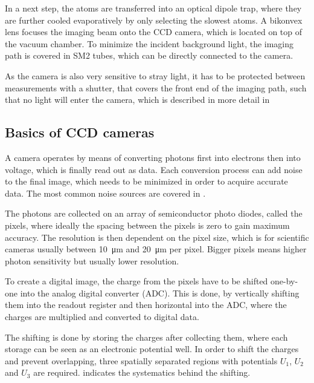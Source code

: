 	In a next step, the atoms are transferred into an optical dipole trap, where they are further cooled evaporatively by only selecting the slowest atoms.
	A bikonvex lens focuses the imaging beam onto the CCD camera, which is located on top of the vacuum chamber. To minimize the incident background light, the imaging path is covered in SM2 tubes, which can be directly connected to the camera.
	
	As the camera is also very sensitive to stray light, it has to be protected between measurements with a shutter, that covers the front end of the imaging path, such that no light will enter the camera, which is described in more detail in 

\subsection{Basics of CCD cameras}
\label{ch:ccd_basics}
	
	A camera operates by means of converting photons first into electrons then into voltage, which is finally read out as data\cite{ccdoperationUrl}\cite{guppy38Bsheet}. Each conversion process can add noise to the final image, which needs to be minimized in order to acquire accurate data. The most common noise sources are covered in .
	
	The photons are collected on an array of semiconductor photo diodes, called the pixels, where ideally the spacing between the pixels is zero to gain maximum accuracy. The resolution is then dependent on the pixel size, which is for scientific cameras usually between \SI{10}{\micro\meter} and \SI{20}{\micro\meter} per pixel. Bigger pixels means higher photon sensitivity but usually lower resolution.
	
	
	To create a digital image, the charge from the pixels have to be shifted one-by-one into the analog digital converter (ADC). This is done, by vertically shifting them into the readout register and then horizontal into the ADC, where the charges are multiplied and converted to digital data.
	
	The shifting is done by storing the charges after collecting them, where each storage can be seen as an electronic potential well. In order to shift the charges and prevent overlapping, three spatially separated regions with potentials $U_1$, $U_2$ and $U_3$ are required.  indicates the systematics behind the shifting.
	
